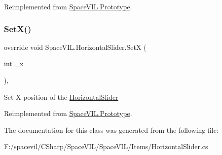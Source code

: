 Reimplemented from \mbox{\hyperlink{class_space_v_i_l_1_1_prototype_ae96644a6ace490afb376fb542161e541}{Space\+V\+I\+L.\+Prototype}}.

\mbox{\label{class_space_v_i_l_1_1_horizontal_slider_ab674da8d7310f5b68f9c85975073b076}} 
\subsubsection{\texorpdfstring{Set\+X()}{SetX()}}
{\footnotesize\ttfamily override void Space\+V\+I\+L.\+Horizontal\+Slider.\+SetX (\begin{DoxyParamCaption}\item[{int}]{\+\_\+x }\end{DoxyParamCaption})\hspace{0.3cm}{\ttfamily [inline]}, {\ttfamily [virtual]}}



Set X position of the \mbox{\hyperlink{class_space_v_i_l_1_1_horizontal_slider}{Horizontal\+Slider}} 



Reimplemented from \mbox{\hyperlink{class_space_v_i_l_1_1_prototype}{Space\+V\+I\+L.\+Prototype}}.



The documentation for this class was generated from the following file\+:\begin{DoxyCompactItemize}
\item 
F\+:/spacevil/\+C\+Sharp/\+Space\+V\+I\+L/\+Space\+V\+I\+L/\+Items/Horizontal\+Slider.\+cs\end{DoxyCompactItemize}
